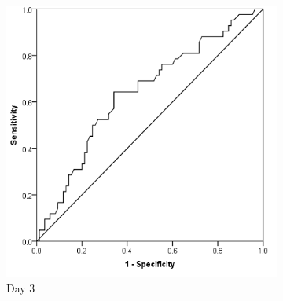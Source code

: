 \vfill


\clearpage
\begin{figure}[t]
	\caption{Receiver operating characteristics curve analysis of C-reactive protein as a marker of postoperative infective complications.}
	\label{fig:crp_comp_ROC_infection}

	\centering
	\begin{subfigure}{0.3\textwidth}
		\centering
		\includegraphics[width=\textwidth]{Figures/crp_comp_ROC_infection_D3}
		\caption{Day 3}
		\label{fig:crp_comp_ROC_infection_D3}
	\end{subfigure}
	\hfill
	\begin{subfigure}{0.3\textwidth}
		\centering

\end{subfigure}
\end{figure}
